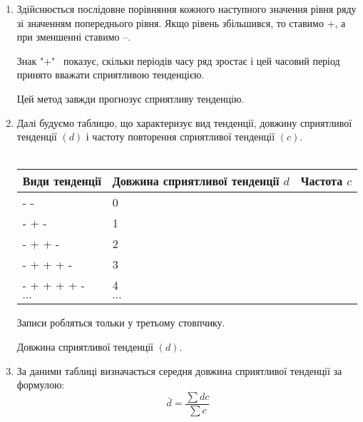 \documentclass[11pt,a4paper]{article}
\begin{document}
\begin{enumerate}
\item Здійснюється послідовне порівняння кожного наступного значення рівня ряду зі значенням попереднього рівня. Якщо рівень збільшився, то ставимо \glqq +\grqq{}, а при зменшенні ставимо \glqq --\grqq.
\par \hspace{1.4cm}Знак "+" \ показує, скільки періодів часу ряд зростає і цей часовий період принято вважати сприятливою тенденцією.
\par \hspace{1.4cm} Цей метод завжди прогнозує сприятливу тенденцію.
\item Далі будуємо таблицю, що характеризує вид тенденції, довжину сприятливої тенденції $\left (d \right )$ і частоту повторення сприятливої тенденції $\left (c \right )$.
\\
\\
\vspace{\baselineskip}
\hspace{1.4cm}\begin{tabular}[central]{ | l | l | l | }
\hline
Види тенденції & Довжина сприятливої тенденції $d$ & Частота $c$ \\ \hline
- -  & 0 &  \\
- + - & 1 &  \\
- + + - & 2 &  \\
- + + + - & 3 &  \\
- + + + + - & 4 &  \\
$\cdots$ & $\cdots$ &  \\
\hline
\end{tabular}
\par \hspace{1.4cm}Записи робляться тольки у третьому стовпчику.
\par \hspace{1.4cm}Довжина сприятливої тенденції $\left (d \right )$.
\item За даними таблиці визначається середня довжина сприятливої тенденції за формулою:
$$\bar{d}=\frac{\sum d c}{\sum c}$$
\end{enumerate}
\end{document}
